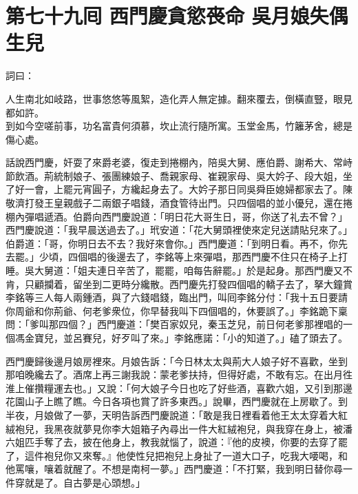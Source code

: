 
\chapter*{第七十九囘 西門慶貪慾䘮命 吳月娘失偶生兒}


詞曰：

\begin{myquote} 
人生南北如岐路，世事悠悠等風絮，造化弄人無定據。翻來覆去，倒橫直豎，眼見都如許。\\
到如今空嗟前事，功名富貴何須慕，坎止流行隨所寓。玉堂金馬，竹籬茅舍，總是傷心處。

\end{myquote} 

話說西門慶，奸耍了來爵老婆，復走到捲棚內，陪吳大舅、應伯爵、謝希大、常峙節飲酒。荊統制娘子、張團練娘子、喬親家母、崔親家母、吳大妗子、段大姐，坐了好一會，上罷元宵圓子，方纔起身去了。大妗子那日同吳舜臣媳婦都家去了。陳敬濟打發王皇親戲子二兩銀子唱錢，酒食管待出門。只四個唱的並小優兒，還在捲棚內彈唱遞酒。伯爵向西門慶說道：「明日花大哥生日，哥，你送了礼去不曾？」西門慶說道：「我早晨送過去了。」玳安道：「花大舅頭裡使來定兒送請貼兒來了。」伯爵道：「哥，你明日去不去？我好來會你。」西門慶道：「到明日看。再不，你先去罷。」少頃，四個唱的後邊去了，李銘等上來彈唱，那西門慶不住只在椅子上打睡。{}吳大舅道：「姐夫連日辛苦了，罷罷，咱每告辭罷。」於是起身。那西門慶又不肯，只顧攔着，留坐到二更時分纔散。西門慶先打發四個唱的轎子去了，拏大鐘賞李銘等三人每人兩鍾酒，與了六錢唱錢，臨出門，叫囘李銘分付：「我十五日要請你周爺和你荊爺、何老爹衆位，你早替我叫下四個唱的，休要誤了。」李銘跪下稟問：「爹叫那四個？」西門慶道：「樊百家奴兒，秦玉芝兒，前日何老爹那裡唱的一個馮金寶兒，{}並呂賽兒，好歹叫了來。」李銘應諾：「小的知道了。」磕了頭去了。

西門慶歸後邊月娘房裡來。月娘告訴：「今日林太太與荊大人娘子好不喜歡，坐到那咱晚纔去了。酒席上再三謝我說：蒙老爹扶持，但得好處，不敢有忘。在出月徃淮上催攢糧運去也。」又說：「何大娘子今日也吃了好些酒，喜歡六姐，又引到那邊花園山子上瞧了瞧。今日各項也賞了許多東西。」說畢，西門慶就在上房歇了。到半夜，月娘做了一夢，{}天明告訴西門慶說道：「敢是我日裡看着他王太太穿着大紅絨袍兒，我黑夜就夢見你李大姐箱子內尋出一件大紅絨袍兒，與我穿在身上，被潘六姐匹手奪了去，披在他身上，教我就惱了，說道：『他的皮襖，你要的去穿了罷了，這件袍兒你又來奪。』{}他使性兒把袍兒上身扯了一道大口子，吃我大喓喝，和他罵嚷，嚷着就醒了。不想是南柯一夢。」西門慶道：「不打緊，我到明日替你尋一件穿就是了。自古夢是心頭想。」

